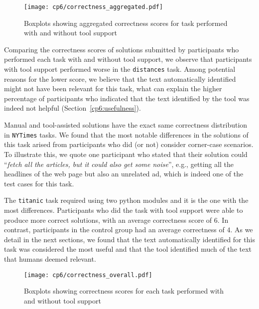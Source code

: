 \medskip
\begin{figure}[h!]
    \centering
    \texttt{[image: cp6/correctness\_aggregated.pdf]}
    \caption{Boxplots showing aggregated correctness scores for task performed with and without tool support}
    \label{fig:correctness-overall}
\end{figure}




Comparing the correctness scores of solutions submitted by participants
who performed each task with and without tool support, we observe that participants with tool support performed worse in the \texttt{distances} task. 
Among potential reasons for the lower score, we believe that the text automatically identified 
might not have been relevant for this task, what can explain the higher percentage of participants
who indicated that the text identified  by the tool was indeed not helpful (Section~\ref{cp6:usefulness}).



Manual and tool-assisted solutions have the exact same correctness distribution in \texttt{NYTimes} tasks.
We found that the most notable differences in the solutions of this task arised from participants who did (or not) consider corner-case scenarios.
To illustrate this, we quote one participant who stated that their solution could ``\textit{fetch all the articles, but it could also get some noise}'',
e.g., getting all the headlines of the web page but also an unrelated ad, which is indeed one of the test cases for this task. 



The \texttt{titanic} task required using two python modules and it is the one with the most differences. 
Participants who did the task with tool support were able to produce more correct solutions, with an average 
correctness score of $6$. In contrast, participants in the control group had an average correctness of $4$. 
As we detail in the next sections, we found that the text automatically identified for this task 
was considered the most useful and that the tool identified much of the text that humans deemed relevant. 





\begin{figure}
    \centering
    \texttt{[image: cp6/correctness\_overall.pdf]}
    \caption{Boxplots showing correctness scores for each task performed with and without tool support}
    \label{fig:correctness-by-task}
\end{figure}




